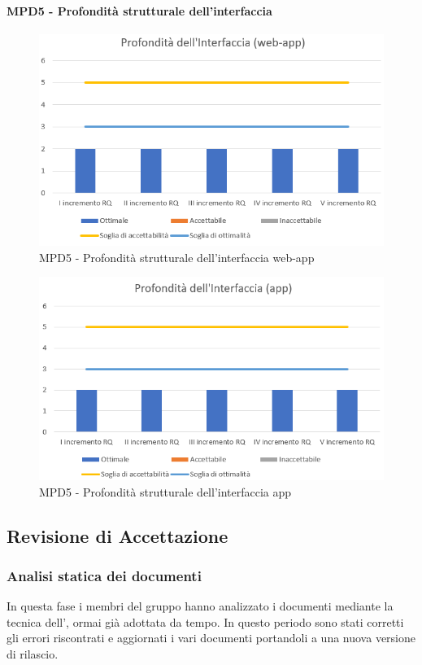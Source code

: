   \clearpage
  \paragraph{MPD5 - Profondità strutturale dell’interfaccia}
  \begin{figure}[h!]
    \centering
      \includegraphics[scale=1]{Immagini/ProfInter WA.PNG}
    \caption{MPD5 - Profondità strutturale dell’interfaccia web-app}
  \end{figure}

  \begin{figure}[h!]
    \centering
      \includegraphics[scale=1]{Immagini/ProfInter APP.PNG}
    \caption{MPD5 - Profondità strutturale dell’interfaccia app}
  \end{figure}

\subsection{Revisione di Accettazione}
\subsubsection{Analisi statica dei documenti}
In questa fase i membri del gruppo \Gruppo{} hanno analizzato i documenti mediante la tecnica dell', ormai già adottata da tempo. In questo periodo sono stati corretti gli errori riscontrati e aggiornati i vari documenti portandoli a una nuova versione di rilascio.
